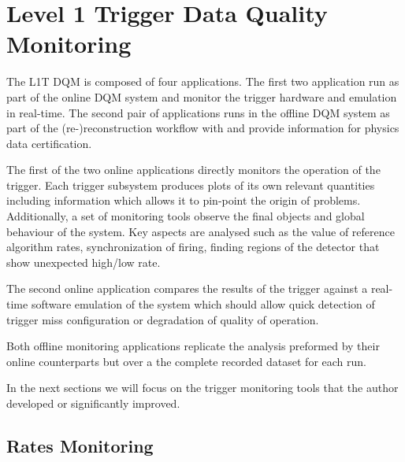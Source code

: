 \section{Level 1 Trigger Data Quality Monitoring}
\label{SECTION:TechnicalWork_L1TDQM}


The \gls{L1T} \gls{DQM} is composed of four applications. The first two application run as part of the online \gls{DQM} system and monitor the trigger hardware and emulation in real-time. The second pair of applications runs in the offline \gls{DQM} system as part of the (re-)reconstruction workflow with and provide information for physics data certification.

The first of the two online applications directly monitors the operation of the trigger. Each trigger subsystem produces plots of its own relevant quantities including information which allows it to pin-point the origin of problems. Additionally, a set of monitoring tools observe the final objects and global behaviour of the system. Key aspects are analysed such as the value of reference algorithm rates, synchronization of firing, finding regions of the detector that show unexpected high/low rate. 

The second online application compares the results of the trigger against a real-time software emulation of the system which should allow quick detection of trigger miss configuration or degradation of quality of operation.

Both offline monitoring applications replicate the analysis preformed by their online counterparts but over a the complete recorded dataset for each run.

In the next sections we will focus on the trigger monitoring tools that the author developed or significantly improved.

\subsection{Rates Monitoring}
\label{SECTION:TechnicalWork_L1TDQM_RatesMonitoring}


